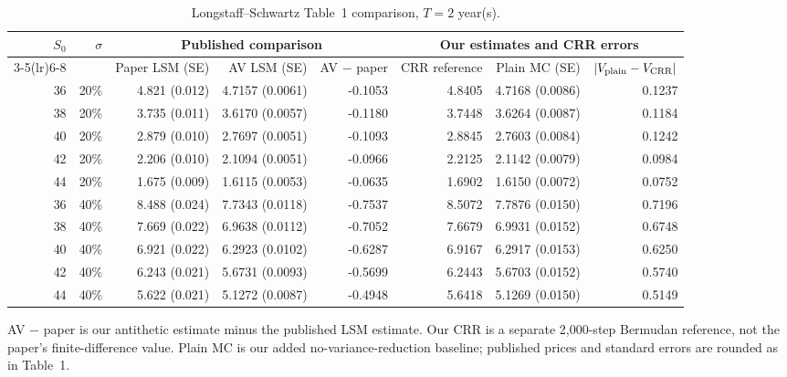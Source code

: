 \begin{table}[!htbp]
    \centering\scriptsize
    \caption{Longstaff--Schwartz Table~1 comparison, \(T=2\) year(s).}
    \label{tab:lsm_paper_comparison_t2}
    \setlength{\tabcolsep}{3pt}
    \begin{tabular*}{\linewidth}{@{\extracolsep{\fill}}rr|rrrrrr}
        \toprule
        \(S_0\) & \(\sigma\) & \multicolumn{3}{c|}{Published comparison} & \multicolumn{3}{c}{Our estimates and CRR errors} \\
        \cmidrule(lr){3-5}\cmidrule(lr){6-8}
        & & Paper LSM (SE) & AV LSM (SE) & AV $-$ paper & CRR reference & Plain MC (SE) & \(|V_{\rm plain}-V_{\rm CRR}|\) \\
        \midrule
        36 & 20\% & 4.821 (0.012) & 4.7157 (0.0061) & -0.1053 & 4.8405 & 4.7168 (0.0086) & 0.1237 \\
        38 & 20\% & 3.735 (0.011) & 3.6170 (0.0057) & -0.1180 & 3.7448 & 3.6264 (0.0087) & 0.1184 \\
        40 & 20\% & 2.879 (0.010) & 2.7697 (0.0051) & -0.1093 & 2.8845 & 2.7603 (0.0084) & 0.1242 \\
        42 & 20\% & 2.206 (0.010) & 2.1094 (0.0051) & -0.0966 & 2.2125 & 2.1142 (0.0079) & 0.0984 \\
        44 & 20\% & 1.675 (0.009) & 1.6115 (0.0053) & -0.0635 & 1.6902 & 1.6150 (0.0072) & 0.0752 \\
        36 & 40\% & 8.488 (0.024) & 7.7343 (0.0118) & -0.7537 & 8.5072 & 7.7876 (0.0150) & 0.7196 \\
        38 & 40\% & 7.669 (0.022) & 6.9638 (0.0112) & -0.7052 & 7.6679 & 6.9931 (0.0152) & 0.6748 \\
        40 & 40\% & 6.921 (0.022) & 6.2923 (0.0102) & -0.6287 & 6.9167 & 6.2917 (0.0153) & 0.6250 \\
        42 & 40\% & 6.243 (0.021) & 5.6731 (0.0093) & -0.5699 & 6.2443 & 5.6703 (0.0152) & 0.5740 \\
        44 & 40\% & 5.622 (0.021) & 5.1272 (0.0087) & -0.4948 & 5.6418 & 5.1269 (0.0150) & 0.5149 \\
        \bottomrule
    \end{tabular*}
    \begin{minipage}{0.96\linewidth}\footnotesize
    AV $-$ paper is our antithetic estimate minus the published LSM estimate. Our CRR is a separate 2,000-step Bermudan reference, not the paper's finite-difference value.
    Plain MC is our added no-variance-reduction baseline; published prices and standard errors are rounded as in Table~1.
    \end{minipage}
\end{table}
